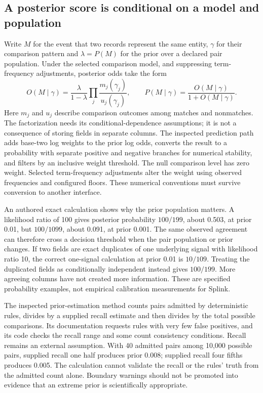 \subsection{A posterior score is conditional on a model and population}
Write $M$ for the event that two records represent the same entity, $\gamma$ for their comparison pattern and $\lambda=P(M)$ for the prior over a declared pair population. Under the selected comparison model, and suppressing term-frequency adjustments, posterior odds take the form
\[
 O(M\mid\gamma)=\frac{\lambda}{1-\lambda}\prod_j\frac{m_j(\gamma_j)}{u_j(\gamma_j)},
 \qquad P(M\mid\gamma)=\frac{O(M\mid\gamma)}{1+O(M\mid\gamma)}.
\]
Here $m_j$ and $u_j$ describe comparison outcomes among matches and nonmatches. The factorization needs its conditional-dependence assumptions; it is not a consequence of storing fields in separate columns. The inspected prediction path adds base-two log weights to the prior log odds, converts the result to a probability with separate positive and negative branches for numerical stability, and filters by an inclusive weight threshold. The null comparison level has zero weight. Selected term-frequency adjustments alter the weight using observed frequencies and configured floors. These numerical conventions must survive conversion to another interface.~\citep{exec24_splink_sources}

An authored exact calculation shows why the prior population matters. A likelihood ratio of 100 gives posterior probability $100/199$, about 0.503, at prior 0.01, but $100/1099$, about 0.091, at prior 0.001. The same observed agreement can therefore cross a decision threshold when the pair population or prior changes. If two fields are exact duplicates of one underlying signal with likelihood ratio 10, the correct one-signal calculation at prior 0.01 is $10/109$. Treating the duplicated fields as conditionally independent instead gives $100/199$. More agreeing columns have not created more information. These are specified probability examples, not empirical calibration measurements for Splink.~\citep{exec24_splink_contract}

The inspected prior-estimation method counts pairs admitted by deterministic rules, divides by a supplied recall estimate and then divides by the total possible comparisons. Its documentation requests rules with very few false positives, and its code checks the recall range and some count consistency conditions. Recall remains an external assumption. With 40 admitted pairs among 10,000 possible pairs, supplied recall one half produces prior 0.008; supplied recall four fifths produces 0.005. The calculation cannot validate the recall or the rules' truth from the admitted count alone. Boundary warnings should not be promoted into evidence that an extreme prior is scientifically appropriate.~\citep{exec24_splink_sources,exec24_splink_contract}

